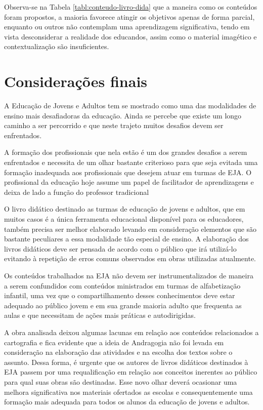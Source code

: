 \begin{refsection}
    Observa-se na Tabela \ref{tabl:conteudo-livro-dida} que a maneira como os conteúdos foram propostos, a maioria favorece atingir os objetivos apenas de forma parcial, enquanto ou outros não contemplam uma aprendizagem significativa, tendo em vista desconsiderar a realidade dos educandos, assim como o material imagético e contextualização são insuficientes. 


    \section{Considerações finais}

    A Educação de Jovens e Adultos tem se mostrado como uma das modalidades de ensino mais desafiadoras da educação. Ainda se percebe que existe um longo caminho a ser percorrido e que neste trajeto muitos desafios devem ser enfrentados. 

    A formação dos profissionais que nela estão é um dos grandes desafios a serem enfrentados e necessita de um olhar bastante criterioso para que seja evitada uma formação inadequada aos profissionais que desejem atuar em turmas de EJA. O profissional da educação hoje assume um papel de facilitador de aprendizagens e deixa de lado a função do professor tradicional 

    O livro didático destinado as turmas de educação de jovens e adultos, que em muitos casos é a única ferramenta educacional disponível para os educadores, também precisa ser melhor elaborado levando em consideração elementos que são bastante peculiares a essa modalidade tão especial de ensino. A elaboração dos livros didáticos deve ser pensada de acordo com o público que irá utilizá-lo evitando à repetição de erros comuns observados em obras utilizadas atualmente. 

    Os conteúdos trabalhados na EJA não devem ser instrumentalizados de maneira a serem confundidos com conteúdos ministrados em turmas de alfabetização infantil, uma vez que o compartilhamento desses conhecimentos deve estar adequado ao público jovem e em sua grande maioria adulto que frequenta as aulas e que necessitam de ações mais práticas e autodirigidas. 

    A obra analisada deixou algumas lacunas em relação aos conteúdos relacionados a cartografia e fica evidente que a ideia de Andragogia não foi levada em consideração na elaboração das atividades e na escolha dos textos sobre o assunto. Dessa forma, é urgente que os autores de livros didáticos destinados à EJA passem por uma requalificação em relação aos conceitos inerentes ao público para qual suas obras são destinadas. Esse novo olhar deverá ocasionar uma melhora significativa nos materiais ofertados as escolas e consequentemente uma formação mais adequada para todos os alunos da educação de jovens e adultos.  

    \printbibliography[heading=subbibliography,notcategory=fullcited]

    \label{chap:alfabetizacao-cartogend}

\end{refsection}
